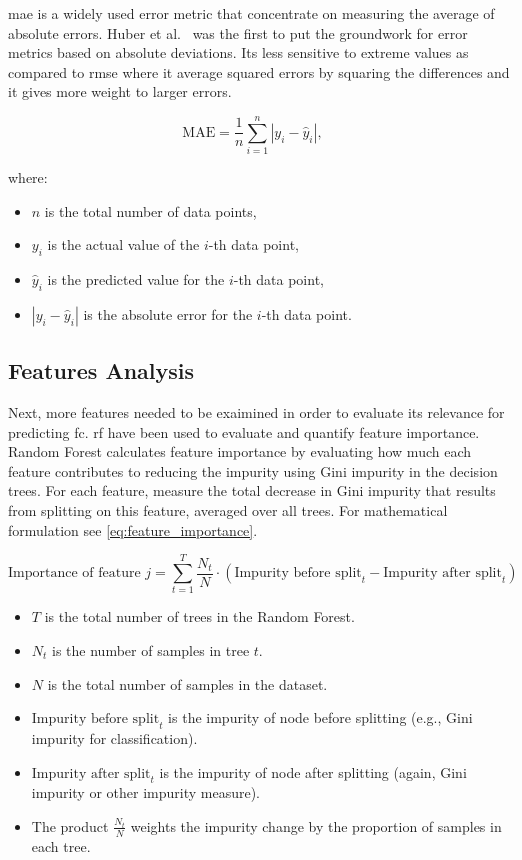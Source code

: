 \ac{mae} is a widely used error metric that concentrate on measuring the average of absolute
errors. Huber et al.~\citep{huber1964robust} was the first to put the groundwork for error metrics based on absolute deviations. 
Its less sensitive to extreme values as compared to \ac{rmse} where it average squared errors by squaring the differences and it gives more weight to larger errors. 

\begin{equation}
    \text{MAE} = \frac{1}{n} \sum_{i=1}^{n} |y_i - \hat{y}_i|, \quad 
    \label{eq:mae}
\end{equation}

where:
\begin{itemize}
    \item $n$ is the total number of data points,
    \item $y_i$ is the actual value of the $i$-th data point,
    \item $\hat{y}_i$ is the predicted value for the $i$-th data point,
    \item $|y_i - \hat{y}_i|$ is the absolute error for the $i$-th data point.
\end{itemize}

\subsection{Features Analysis}\label{sec:feature_analysis}

Next, more features needed to be exaimined in order to evaluate its relevance for predicting \ac{fc}. \ac{rf} have been used to evaluate and quantify feature importance. 
Random Forest calculates feature importance by evaluating how much each feature contributes to reducing the impurity 
using Gini impurity in the decision trees. For each feature, measure the total decrease in Gini impurity that results from splitting on this feature, 
averaged over all trees. For mathematical formulation see \cref{eq:feature_importance}. 

\begin{equation}
    \text{Importance of feature } j = \sum_{t=1}^{T} \frac{N_t}{N} \cdot \left( \text{Impurity before split}_t - \text{Impurity after split}_t \right)
    \label{eq:feature_importance}
\end{equation}

\begin{itemize}
    \item $T$ is the total number of trees in the Random Forest.
    \item $N_t$ is the number of samples in tree $t$.
    \item $N$ is the total number of samples in the dataset.
    \item $\text{Impurity before split}_t$ is the impurity of node before splitting (e.g., Gini impurity for classification).
    \item $\text{Impurity after split}_t$ is the impurity of node after splitting (again, Gini impurity or other impurity measure).
    \item The product $\frac{N_t}{N}$ weights the impurity change by the proportion of samples in each tree.
\end{itemize}

